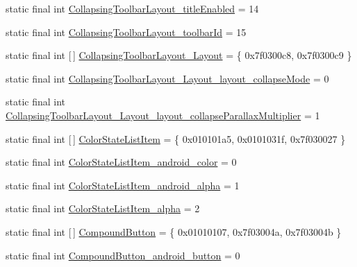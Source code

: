 \begin{DoxyCompactItemize}
static final int \mbox{\hyperlink{classandroid_1_1support_1_1design_1_1R_1_1styleable_a653a3ffa637cabbce960a62a3ace1972}{Collapsing\+Toolbar\+Layout\+\_\+title\+Enabled}} = 14
\item 
static final int \mbox{\hyperlink{classandroid_1_1support_1_1design_1_1R_1_1styleable_ad0d7a6184e81edf8ac6520145708bb74}{Collapsing\+Toolbar\+Layout\+\_\+toolbar\+Id}} = 15
\item 
static final int \mbox{[}$\,$\mbox{]} \mbox{\hyperlink{classandroid_1_1support_1_1design_1_1R_1_1styleable_a21f871cca62a42d629c86010cc006092}{Collapsing\+Toolbar\+Layout\+\_\+\+Layout}} = \{ 0x7f0300c8, 0x7f0300c9 \}
\item 
static final int \mbox{\hyperlink{classandroid_1_1support_1_1design_1_1R_1_1styleable_ab2374822f464f783003bb86cda4a9753}{Collapsing\+Toolbar\+Layout\+\_\+\+Layout\+\_\+layout\+\_\+collapse\+Mode}} = 0
\item 
static final int \mbox{\hyperlink{classandroid_1_1support_1_1design_1_1R_1_1styleable_afaeabc3cbad825e3dfd5601c97458acc}{Collapsing\+Toolbar\+Layout\+\_\+\+Layout\+\_\+layout\+\_\+collapse\+Parallax\+Multiplier}} = 1
\item 
static final int \mbox{[}$\,$\mbox{]} \mbox{\hyperlink{classandroid_1_1support_1_1design_1_1R_1_1styleable_a06173f77bcf3bbc36e80eb4969fc61b7}{Color\+State\+List\+Item}} = \{ 0x010101a5, 0x0101031f, 0x7f030027 \}
\item 
static final int \mbox{\hyperlink{classandroid_1_1support_1_1design_1_1R_1_1styleable_a97c236b067e63c3c836b5d690cc14f6d}{Color\+State\+List\+Item\+\_\+android\+\_\+color}} = 0
\item 
static final int \mbox{\hyperlink{classandroid_1_1support_1_1design_1_1R_1_1styleable_a5648cb9d7ec19125f394936186b01681}{Color\+State\+List\+Item\+\_\+android\+\_\+alpha}} = 1
\item 
static final int \mbox{\hyperlink{classandroid_1_1support_1_1design_1_1R_1_1styleable_af469ede1aced51d93b9cf6e08ca6ba14}{Color\+State\+List\+Item\+\_\+alpha}} = 2
\item 
static final int \mbox{[}$\,$\mbox{]} \mbox{\hyperlink{classandroid_1_1support_1_1design_1_1R_1_1styleable_a1e3ef000b9dccc62673df5ec6d13a547}{Compound\+Button}} = \{ 0x01010107, 0x7f03004a, 0x7f03004b \}
\item 
static final int \mbox{\hyperlink{classandroid_1_1support_1_1design_1_1R_1_1styleable_a6d7b51f19ad5b7b394b8fc42c69a09ec}{Compound\+Button\+\_\+android\+\_\+button}} = 0
\item 

\end{DoxyCompactItemize}
